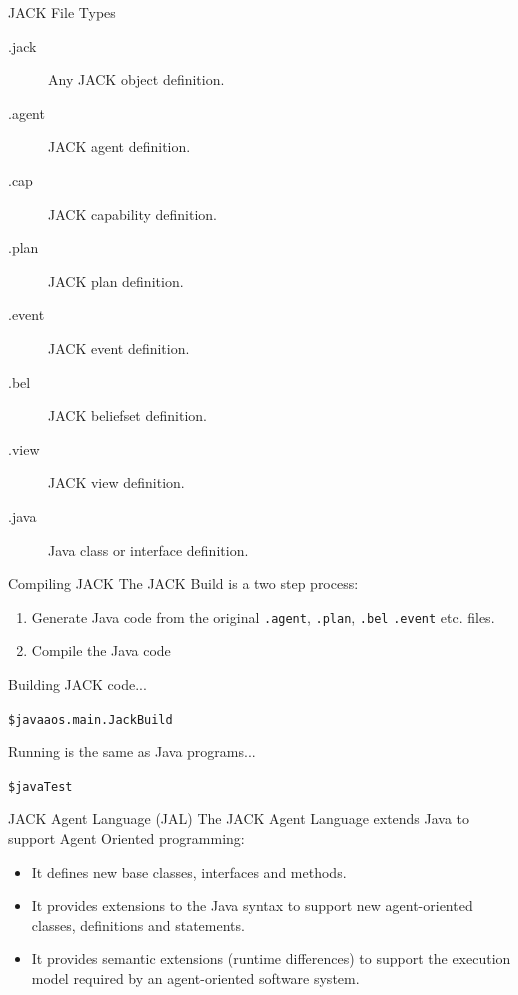 \documentclass[aspectratio=1610,xcolor=dvipsnames,t]{beamer}
\begin{document}
\begin{frame}{JACK File Types}
    \begin{description}
        \item[.jack] Any JACK object definition.
        \item[.agent] JACK agent definition.
        \item[.cap] JACK capability definition.
        \item[.plan] JACK plan definition.
        \item[.event] JACK event definition.
        \item[.bel] JACK beliefset definition.
        \item[.view] JACK view definition.
        \item[.java] Java class or interface definition. 
    \end{description}
\end{frame} 

\begin{frame}{Compiling JACK}
    The JACK Build is a two step process:
    \begin{enumerate}
        \item Generate Java code from the original 
              \texttt{.agent}, \texttt{.plan}, \texttt{.bel}
              \texttt{.event} etc. files.
        \item Compile the Java code
    \end{enumerate}
    \begin{block}{Building JACK code...}
        \begin{alltt}
            \$ java aos.main.JackBuild
        \end{alltt} 
    \end{block} 
    \begin{exampleblock}{Running is the same as Java programs...}
        \begin{alltt}
            \$ java Test
        \end{alltt} 
    \end{exampleblock} 
\end{frame} 

\begin{frame}{JACK Agent Language (JAL)} 
    The JACK Agent Language extends Java to support Agent Oriented programming:
    \begin{itemize}
        \item It defines new base classes, interfaces and methods. 
        \item It provides extensions to the Java syntax to support new 
              agent-oriented classes, definitions and statements. 
        \item It provides semantic extensions (runtime differences) 
              to support the execution model required by 
              an agent-oriented software system.
    \end{itemize} 
\end{frame} 
\end{document}
